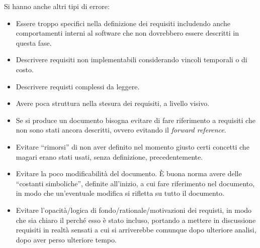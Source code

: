 Si hanno anche altri tipi di errore:
\begin{itemize}
      \item Essere troppo specifici nella definizione dei requisiti includendo
            anche comportamenti interni al software che non dovrebbero essere
            descritti in questa fase.
      \item Descrivere requisiti non implementabili considerando vincoli
            temporali o di costo.
      \item Descrivere requisti complessi da leggere.
      \item Avere poca struttura nella stesura dei requisiti, a livello visivo.
      \item Se si produce un documento bisogna evitare di fare riferimento a
            requisiti che non sono stati ancora descritti, ovvero evitando il
            \textit{forward reference}.
      \item Evitare “rimorsi” di non aver definito nel momento giusto certi
            concetti che magari erano stati usati, senza definizione, precedentemente.
      \item Evitare la poco modificabilità del documento. È buona norma avere
            delle “costanti simboliche”, definite all'inizio, a cui fare
            riferimento nel documento, in modo che un'eventuale modifica si
            rifletta su tutto il documento.
      \item Evitare l'opacità/logica di fondo/rationale/motivazioni dei requisti,
            in modo che sia chiaro il perché esso è stato incluso, portando a
            mettere in discussione requisiti in realtà sensati a cui si arriverebbe
            comunque dopo ulteriore analisi, dopo aver perso ulteriore tempo.
\end{itemize}
